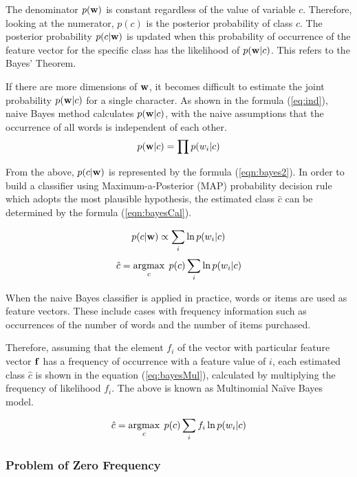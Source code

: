 The denominator  $p({\bf w})$  is constant regardless of the value of variable $c$. Therefore, looking at the numerator, $p(c)$ is the posterior probability of class $c$. 
The posterior probability $p(c|{\bf w})$  is updated when this probability of occurrence of the feature vector for the specific class has the likelihood of  $p({\bf w}|c)$.  This refers to the Bayes' Theorem.

If there are more dimensions of ${\bf w}$, it becomes difficult to estimate the joint probability $p({\bf w}|c)$ for a single character. As shown in the formula (\ref{eq:ind}), naive Bayes method calculates $p({\bf w}|c)$, with the naive assumptions that the occurrence of all words is independent of each other.
\begin{equation}
p({\bf w} | c)=\prod p(w_i|c)
\label{eq:ind}
\end{equation}

From the above, $p(c|{\bf w})$ is represented by the formula (\ref{eqn:bayes2}). In order to build a classifier using Maximum-a-Posterior (MAP) probability decision rule which adopts the most plausible hypothesis, the estimated class ${\hat c}$ can be determined by the formula (\ref{eqn:bayesCal}).

\begin{equation}
p(c|{\bf w}) \propto \sum_i \ln{p(w_i|c)}
\label{eqn:bayes2}
\end{equation}
%
\begin{equation}
{\hat c}=\mathop{\rm argmax}\limits_{c} \; p(c)\sum_i \ln{p(w_i|c)}
\label{eqn:bayesCal}
\end{equation}

When the naive Bayes classifier is applied in practice, words or items are used as  feature vectors. These include cases with frequency information such as occurrences of the number of words and the number of items purchased.

Therefore, assuming that the element $f_i$ of the vector with particular feature vector ${\bf f}$ has a frequency of occurrence with a feature value of $i$, each estimated class ${\hat c}$ is shown in the equation  (\ref{eq:bayesMul}), calculated by multiplying the frequency of likelihood $f_i$. The above is known as Multinomial Na{\"i}ve Bayes model.


\begin{equation}
{\hat c}=\mathop{\rm argmax}\limits_{c} \; p(c)\sum_i f_i \ln{p(w_i|c})
\label{eq:bayesMul}
\end{equation}

\subsubsection*{Problem of Zero Frequency}


